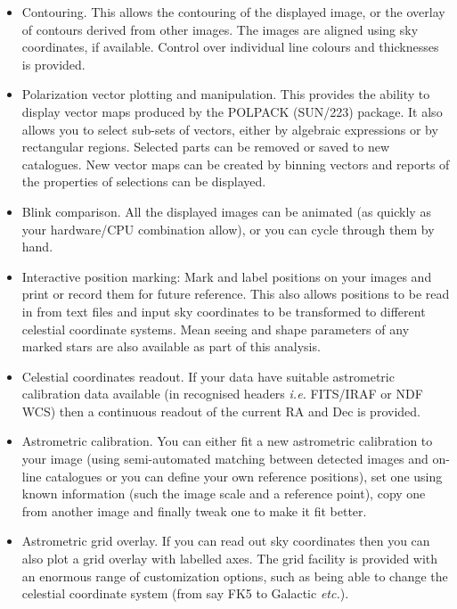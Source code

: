\documentclass[twoside,11pt]{article}
\newcommand{\xref}[3]{#1}
\renewcommand{\_}{\texttt{\symbol{95}}}
\begin{document}
\begin{itemize}
\item Contouring. This allows the contouring of the displayed image,
 or the overlay of contours derived from other images. The images are
 aligned using sky coordinates, if available. Control over individual
 line colours and thicknesses is provided.

\item Polarization vector plotting and manipulation. This provides the
 ability to display vector maps produced by the POLPACK
 (\xref{SUN/223}{sun223}{}) package. It also allows you to select
 sub-sets of vectors, either by algebraic expressions or by rectangular
 regions. Selected parts can be removed or saved to new catalogues. New
 vector maps can be created by binning vectors and reports of the
 properties of selections can be displayed.

\item Blink comparison. All the displayed images can be animated
  (as quickly as your hardware/CPU combination allow), or
  you can cycle through them by hand.

\item Interactive position marking: Mark and label positions on your
  images and print or record them for future reference. This also
  allows positions to be read in from text files and input sky
  coordinates to be transformed to different celestial coordinate
  systems. Mean seeing and shape parameters of any marked stars are
  also available as part of this analysis.

\item Celestial coordinates readout. If your data have suitable
  astrometric calibration data available (in recognised headers
  \textit{i.e.} FITS/IRAF or NDF WCS) then a continuous readout of the
  current RA and Dec is provided.

\item Astrometric calibration. You can either fit a new astrometric
  calibration to your image (using semi-automated matching between detected
  images and on-line catalogues or you can define your own reference
  positions), set one using known information (such the image scale and a
  reference point), copy one from another image and finally tweak one to make
  it fit better.

\item Astrometric grid overlay. If you can read out sky coordinates
  then you can also plot a grid overlay with labelled
  axes. The grid facility is provided with an enormous range of
  customization options, such as being able to change the
  celestial coordinate system (from say FK5 to  Galactic {\em etc.}).


\end{itemize}
\end{document}
